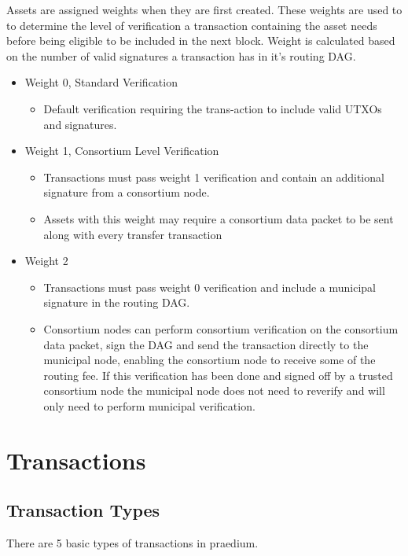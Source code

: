 \documentclass[12pt]{article}
\begin{document}
Assets are assigned weights when they are first created. These weights are used to
to determine the level of verification a transaction containing the asset needs before
being eligible to be
included in the next block. Weight is calculated based on the number of valid signatures
a transaction has in it's routing DAG.


\begin{itemize}
	\item Weight 0, Standard Verification
		\begin{itemize}
			\item{Default verification requiring the trans-action to include
				valid UTXOs and signatures.}
		\end{itemize}
	\item Weight 1, Consortium Level Verification
		\begin{itemize}
			\item{Transactions must pass weight 1 verification and contain an
				additional signature from a consortium node.}
			\item{Assets with this weight may require a consortium data packet
				to be sent along with every transfer transaction}
		\end{itemize}
	\item Weight 2
		\begin{itemize}
			\item{Transactions must pass weight 0 verification and include a 
				municipal signature in the routing DAG.}
			\item{Consortium nodes can perform consortium verification on
				the consortium data packet, sign the DAG and send the
				transaction directly to the municipal node, enabling
				the consortium node to receive some of the routing fee.
				If this verification has been done and signed off by
				a trusted consortium node the municipal node does not
				need to reverify and will only need to
				perform municipal verification.}
		\end{itemize}
\end{itemize}



\section{Transactions}

\subsection{Transaction Types}
There are 5 basic types of transactions in praedium.
\end{document}
